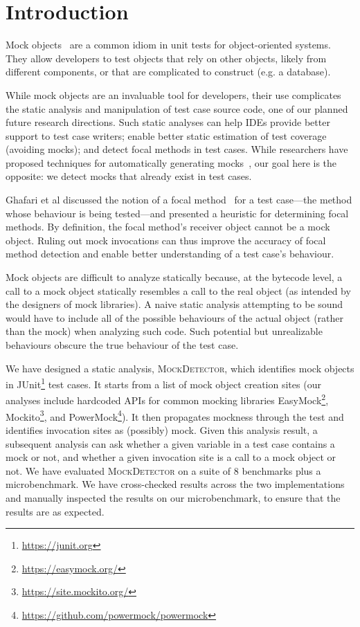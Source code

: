 \section{Introduction}
\label{sec:introduction}

Mock objects~\cite{beck02:_test_driven_devel} are a common idiom in
unit tests for object-oriented systems.  They allow developers to test objects that 
rely on other objects, likely from different components, or that are complicated 
to construct (e.g. a database).

While mock objects are an invaluable tool for developers, their use
complicates the static analysis and manipulation of test case source code, one of our planned future
research directions. Such static analyses can help IDEs provide better
support to test case writers; enable better static estimation of test coverage
(avoiding mocks); and detect focal methods in test cases. While researchers have
proposed techniques for automatically generating mocks~\cite{alshahwan10:_autom,fazzini20:_framew_autom_test_mockin_mobil_apps}, our goal here is the opposite:
we detect mocks that already exist in test cases.

Ghafari et al discussed the notion of a focal method~\cite{ghafari15:_autom} for a test case---the method
whose behaviour is being tested---and presented a heuristic for determining focal methods.
By definition, the focal method's receiver object cannot be a mock object.
Ruling out mock invocations can thus improve the accuracy of focal method detection and
enable better understanding of a test case's behaviour.

Mock objects are difficult to analyze statically because, at the bytecode level,
a call to a mock object statically resembles a call to the real object (as
intended by the designers of mock libraries).
A naive static analysis attempting to be sound would have to include all of 
the possible behaviours of the actual object (rather than the mock) when analyzing such code. 
Such potential but unrealizable behaviours obscure the true behaviour 
of the test case.

We have designed a static analysis, \textsc{MockDetector}, which identifies
mock objects in JUnit\footnote{\url{https://junit.org}} test cases. It starts from a list of mock object creation sites
(our analyses include hardcoded APIs for common mocking libraries EasyMock\footnote{\url{https://easymock.org/}}, Mockito\footnote{\url{https://site.mockito.org/}}, and PowerMock\footnote{\url{https://github.com/powermock/powermock}}). 
It then propagates mockness
through the test and identifies invocation sites as (possibly) mock.
Given this analysis result, a subsequent analysis
can ask whether a given variable in a test case contains a mock or not, and
whether a given invocation site is a call to a mock object or not. We have
evaluated \textsc{MockDetector} on a suite of 8 benchmarks plus a microbenchmark. 
We have cross-checked results across the two implementations and manually inspected
the results on our microbenchmark, to ensure that the results are as expected.

